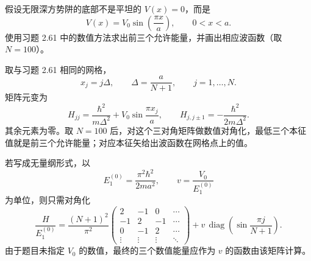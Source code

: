 \begin{question}
假设无限深方势阱的底部不是平坦的 $V(x)=0$，而是
\[
V(x)=V_0\sin\left(\frac{\pi x}{a}\right),\qquad 0<x<a .
\]
使用习题 2.61 中的数值方法求出前三个允许能量，并画出相应波函数（取 $N=100$）。
\end{question}
\begin{solution}
取与习题 2.61 相同的网格，
\[
x_j=j\Delta,
\qquad \Delta=\frac{a}{N+1},
\qquad j=1,\ldots,N.
\]
矩阵元变为
\[
H_{jj}=\frac{\hbar^2}{m\Delta^2}+V_0\sin\frac{\pi x_j}{a},
\qquad
H_{j,j\pm1}=-\frac{\hbar^2}{2m\Delta^2}.
\]
其余元素为零。取 $N=100$ 后，对这个三对角矩阵做数值对角化，最低三个本征值就是前三个允许能量；对应本征矢给出波函数在网格点上的值。

若写成无量纲形式，以
\[
E_1^{(0)}=\frac{\pi^2\hbar^2}{2ma^2},
\qquad v=\frac{V_0}{E_1^{(0)}}
\]
为单位，则只需对角化
\[
\frac{H}{E_1^{(0)}}=\frac{(N+1)^2}{\pi^2}
\begin{pmatrix}
2&-1&0&\cdots\\
-1&2&-1&\cdots\\
0&-1&2&\cdots\\
\vdots&\vdots&\vdots&\ddots
\end{pmatrix}
+v\,\operatorname{diag}\left(\sin\frac{\pi j}{N+1}\right).
\]
由于题目未指定 $V_0$ 的数值，最终的三个数值能量应作为 $v$ 的函数由该矩阵计算。
\end{solution}

